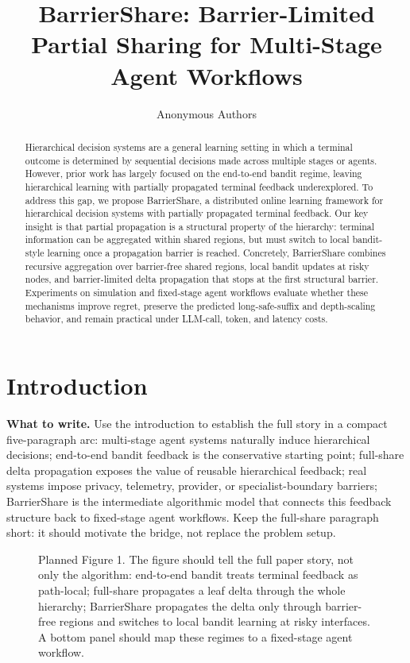 \documentclass{article}
\title{BarrierShare: Barrier-Limited Partial Sharing for Multi-Stage Agent Workflows}
\author{Anonymous Authors}
\newcommand{\towrite}[1]{\noindent\textbf{What to write.} #1}
\begin{document}
\maketitle

\begin{abstract}
Hierarchical decision systems are a general learning setting in which a terminal outcome is determined by sequential decisions made across multiple stages or agents.
However, prior work has largely focused on the end-to-end bandit regime, leaving hierarchical learning with partially propagated terminal feedback underexplored. 
To address this gap, we propose BarrierShare, a distributed online learning framework for hierarchical decision systems with partially propagated terminal feedback.
Our key insight is that partial propagation is a structural property of the hierarchy: terminal information can be aggregated within shared regions, but must switch to local bandit-style learning once a propagation barrier is reached. 
Concretely, BarrierShare combines recursive aggregation over barrier-free shared regions, local bandit updates at risky nodes, and barrier-limited delta propagation that stops at the first structural barrier.
Experiments on simulation and fixed-stage agent workflows evaluate whether these mechanisms improve regret, preserve the predicted long-safe-suffix and depth-scaling behavior, and remain practical under LLM-call, token, and latency costs.

\end{abstract}

\section{Introduction}

\towrite{Use the introduction to establish the full story in a compact five-paragraph arc: multi-stage agent systems naturally induce hierarchical decisions; end-to-end bandit feedback is the conservative starting point; full-share delta propagation exposes the value of reusable hierarchical feedback; real systems impose privacy, telemetry, provider, or specialist-boundary barriers; BarrierShare is the intermediate algorithmic model that connects this feedback structure back to fixed-stage agent workflows. Keep the full-share paragraph short: it should motivate the bridge, not replace the problem setup.}

\begin{figure}[t]
    \centering
    \fbox{\rule{0pt}{1.8in}\rule{0.98\textwidth}{0pt}}
    \caption{Planned Figure 1. The figure should tell the full paper story, not only the algorithm: end-to-end bandit treats terminal feedback as path-local; full-share propagates a leaf delta through the whole hierarchy; BarrierShare propagates the delta only through barrier-free regions and switches to local bandit learning at risky interfaces. A bottom panel should map these regimes to a fixed-stage agent workflow.}
    \label{fig:overview}
\end{figure}
\end{document}
